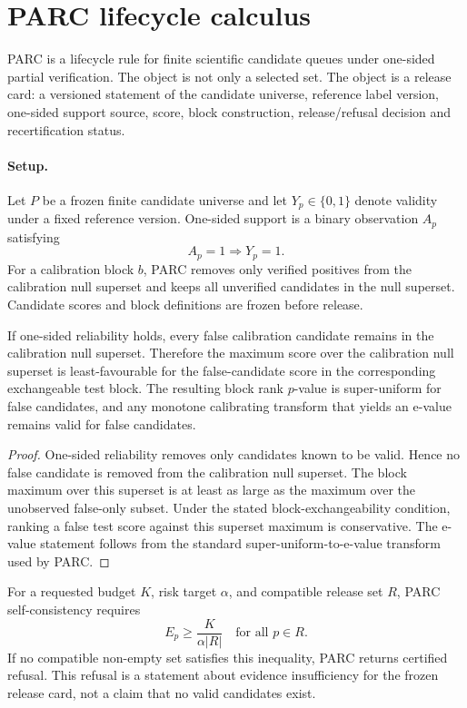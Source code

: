\section{PARC lifecycle calculus}
\label{sec:parc-lifecycle-calculus}

PARC is a lifecycle rule for finite scientific candidate queues under
one-sided partial verification.  The object is not only a selected set.  The
object is a release card: a versioned statement of the candidate universe,
reference label version, one-sided support source, score, block construction,
release/refusal decision and recertification status.

\paragraph{Setup.}
Let \(P\) be a frozen finite candidate universe and let \(Y_p\in\{0,1\}\)
denote validity under a fixed reference version.  One-sided support is a
binary observation \(A_p\) satisfying
\[
  A_p=1 \Rightarrow Y_p=1 .
\]
For a calibration block \(b\), PARC removes only verified positives from the
calibration null superset and keeps all unverified candidates in the null
superset.  Candidate scores and block definitions are frozen before release.

\begin{theorem}
If one-sided reliability holds, every false calibration candidate remains in
the calibration null superset.  Therefore the maximum score over the
calibration null superset is least-favourable for the false-candidate score in
the corresponding exchangeable test block.  The resulting block rank
\(p\)-value is super-uniform for false candidates, and any monotone
calibrating transform that yields an e-value remains valid for false
candidates.
\end{theorem}

\begin{proof}
One-sided reliability removes only candidates known to be valid.  Hence no
false candidate is removed from the calibration null superset.  The block
maximum over this superset is at least as large as the maximum over the
unobserved false-only subset.  Under the stated block-exchangeability
condition, ranking a false test score against this superset maximum is
conservative.  The e-value statement follows from the standard
super-uniform-to-e-value transform used by PARC.
\end{proof}

\begin{proposition}
For a requested budget \(K\), risk target \(\alpha\), and compatible release
set \(R\), PARC self-consistency requires
\[
  E_p \ge \frac{K}{\alpha |R|}
  \quad \text{for all } p\in R .
\]
If no compatible non-empty set satisfies this inequality, PARC returns
certified refusal.  This refusal is a statement about evidence insufficiency
for the frozen release card, not a claim that no valid candidates exist.
\end{proposition}

